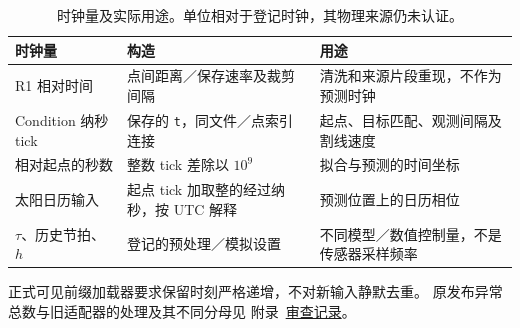\begin{table}[htbp]
\centering\small
\caption{时钟量及实际用途。单位相对于登记时钟，其物理来源仍未认证。}
\label{tab:clock-use}\hypertarget{tab:clock-use}{}
\begin{tabular}{@{}p{.25\linewidth}p{.36\linewidth}p{.32\linewidth}@{}}
\toprule
时钟量 & 构造 & 用途\\
\midrule
R1 相对时间 & 点间距离／保存速率及裁剪间隔 & 清洗和来源片段重现，不作为预测时钟\\
Condition 纳秒 tick & 保存的 \texttt{t}，同文件／点索引连接 & 起点、目标匹配、观测间隔及割线速度\\
相对起点的秒数 & 整数 tick 差除以 \(10^9\) & 拟合与预测的时间坐标\\
太阳日历输入 & 起点 tick 加取整的经过纳秒，按 UTC 解释 & 预测位置上的日历相位\\
\(\tau\)、历史节拍、\(h\) & 登记的预处理／模拟设置 & 不同模型／数值控制量，不是传感器采样频率\\
\bottomrule
\end{tabular}
\end{table}

正式可见前缀加载器要求保留时刻严格递增，不对新输入静默去重。
原发布异常总数与旧适配器的处理及其不同分母见
附录~\href{audit-notes.pdf\#sec:source-reconciliation-details}{审查记录}。

